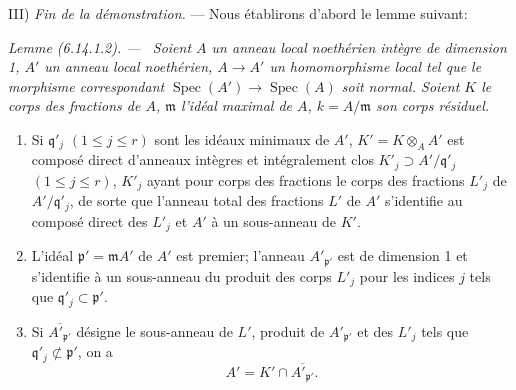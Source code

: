 \documentclass[10pt,oneside]{book}
\newenvironment{lemma}[1][]{%
  \par\medskip\noindent\itshape Lemme (#1). ---\ }{\par}
\begin{document}
III) \emph{Fin de la démonstration.} --- Nous établirons d'abord le lemme
suivant:

\begin{lemma}[6.14.1.2]
\label{IV.2.s6.14.1.2-fr}
Soient $A$ un anneau local noethérien intègre de dimension 1, $A'$ un
anneau local noethérien, $A\to A'$ un homomorphisme local tel que le
morphisme correspondant $\operatorname{Spec}(A')\to\operatorname{Spec}(A)$
soit normal. Soient $K$ le corps des fractions de $A$, $\mathfrak m$
l'idéal maximal de $A$, $k=A/\mathfrak m$ son corps résiduel.
\begin{enumerate}
\item[(i)] Si $\mathfrak q'_j$ $(1\leqslant j\leqslant r)$ sont les idéaux
minimaux de $A'$, $K'=K\otimes_A A'$ est composé direct d'anneaux intègres
et intégralement clos $K'_j\supset A'/\mathfrak q'_j$
$(1\leqslant j\leqslant r)$, $K'_j$ ayant pour corps des fractions le corps
des fractions $L'_j$ de $A'/\mathfrak q'_j$, de sorte que l'anneau total des
fractions $L'$ de $A'$ s'identifie au composé direct des $L'_j$ et $A'$ à
un sous-anneau de $K'$.
\item[(ii)] L'idéal $\mathfrak p'=\mathfrak mA'$ de $A'$ est premier;
l'anneau $A'_{\mathfrak p'}$ est de dimension 1 et s'identifie à un
sous-anneau du produit des corps $L'_j$ pour les indices $j$ tels que
$\mathfrak q'_j\subset\mathfrak p'$.
\item[(iii)] Si $\overline{A'_{\mathfrak p'}}$ désigne le sous-anneau de
$L'$, produit de $A'_{\mathfrak p'}$ et des $L'_j$ tels que
$\mathfrak q'_j\not\subset\mathfrak p'$, on a
\begin{equation}
\tag{6.14.1.3}
\label{IV.2.s6.14.1.3-fr}
A'=K'\cap\overline{A'_{\mathfrak p'}}.
\end{equation}
\end{enumerate}
\end{lemma}
\end{document}
